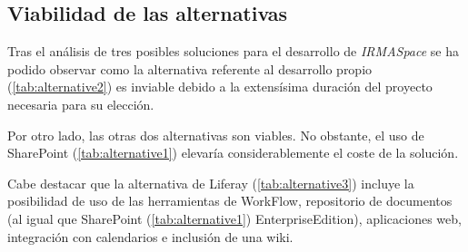 \newpage
\subsection{Viabilidad de las alternativas}

\par Tras el análisis de tres posibles soluciones para el desarrollo de \textit{IRMASpace} se ha podido observar como la alternativa referente al desarrollo propio (\ref{tab:alternative2}) es inviable debido a la extensísima duración del proyecto necesaria para su elección.

\par Por otro lado, las otras dos alternativas son viables. No obstante, el uso de SharePoint (\ref{tab:alternative1}) elevaría considerablemente el coste de la solución.

\par Cabe destacar que la alternativa de Liferay (\ref{tab:alternative3}) incluye la posibilidad de uso de las herramientas de WorkFlow, repositorio de documentos (al igual que  SharePoint (\ref{tab:alternative1}) EnterpriseEdition), aplicaciones web, integración con calendarios e inclusión de una wiki.
